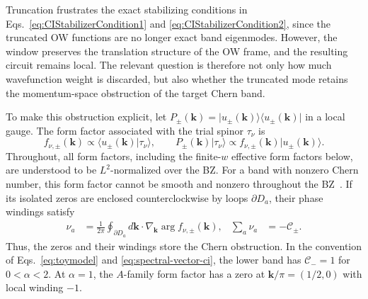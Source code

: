 \documentclass[aps,prb,twocolumn,superscriptaddress,longbibliography,floatfix]{revtex4-2}
\newcommand{\mc}[1]{\mathcal{#1}}
\theoremstyle{plain}
\theoremstyle{definition}
\theoremstyle{remark}
\begin{document}
Truncation frustrates the exact stabilizing conditions in Eqs.~\eqref{eq:CIStabilizerCondition1} and \eqref{eq:CIStabilizerCondition2}, since the truncated OW functions are no longer exact band eigenmodes. However, the window preserves the translation structure of the OW frame, and the resulting circuit remains local. The relevant question is therefore not only how much wavefunction weight is discarded, but also whether the truncated mode retains the momentum-space obstruction of the target Chern band.

To make this obstruction explicit, let $P_\pm(\boldsymbol k)=\lvert u_\pm(\boldsymbol k)\rangle\langle u_\pm(\boldsymbol k)\rvert$ in a local gauge. The form factor associated with the trial spinor $\tau_\nu$ is
\begin{equation}
    f_{\nu,\pm}(\boldsymbol k)
    \propto
    \langle u_\pm(\boldsymbol k)\vert\tau_\nu\rangle,
    \qquad
    P_\pm(\boldsymbol k)\lvert\tau_\nu\rangle
    \propto
    f_{\nu,\pm}(\boldsymbol k)\lvert u_\pm(\boldsymbol k)\rangle.
    \label{eq:OWFormFactor}
\end{equation}
Throughout, all form factors, including the finite-$w$ effective form factors below, are understood to be $L^2$-normalized over the BZ. For a band with nonzero Chern number, this form factor cannot be smooth and nonzero throughout the BZ~\cite{BhuiyanPanJian2026}. If its isolated zeros are enclosed counterclockwise by loops $\partial D_a$, their phase windings satisfy
\begin{align}
    \nu_a
    &=
    \frac{1}{2\pi}\oint_{\partial D_a}
    d\boldsymbol k\cdot\nabla_{\boldsymbol k}
    \arg f_{\nu,\pm}(\boldsymbol k),
    &
    \sum_a\nu_a&=-\mc C_\pm.
    \label{eq:FormFactorZeroChern}
\end{align}
Thus, the zeros and their windings store the Chern obstruction. In the convention of Eqs.~\eqref{eq:toymodel} and \eqref{eq:spectral-vector-ci}, the lower band has $\mc C_-=1$ for $0<\alpha<2$. At $\alpha=1$, the $A$-family form factor has a zero at $\boldsymbol k/\pi=(1/2,0)$ with local winding $-1$.
\end{document}
